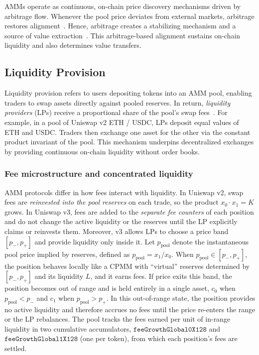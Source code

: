 \documentclass[10pt,conference,compsocconf]{IEEEtran}
\begin{document}
AMMs operate as continuous, on-chain price discovery mechanisms driven by arbitrage flow. Whenever the pool price deviates from external markets, arbitrage restores alignment~\cite{angeris2020improved}.
Hence, arbitrage creates a stabilizing mechanism and a source of value extraction~\cite{pusceddu2024lean}.
This arbitrage-based alignment sustains on-chain liquidity and also determines value transfers.

\subsection{Liquidity Provision}
\label{sec:liquidity-provision}

Liquidity provision refers to users depositing tokens into an AMM pool, enabling traders to swap assets directly against pooled reserves. In return, \textit{liquidity providers} (LPs) receive a proportional share of the pool’s swap fees~\cite{gogol2024sok, chiu2023fragility, saengchote2023decentralized}.
For example, in a pool of Uniswap v2 ETH / USDC, LPs deposit equal values of ETH and USDC. Traders then exchange one asset for the other via the constant product invariant of the pool. This mechanism underpins decentralized exchanges by providing continuous on-chain liquidity without order books.

\subsubsection{Fee microstructure and concentrated liquidity}
AMM protocols differ in how fees interact with liquidity.
In Uniswap v2, swap fees are \emph{reinvested into the pool reserves} on each trade, so the product $x_0 \cdot x_1{=}K$ grows.
In Uniswap v3, fees are added to the \emph{separate fee counters} of each position and do not change the active liquidity or the reserves until the LP explicitly claims or reinvests them.
Moreover, v3 allows LPs to choose a price band $[p_{-},p_{+}]$ and provide liquidity only inside it.
Let $p_{\text{pool}}$ denote the instantaneous pool price implied by reserves, defined as
$p_{\text{pool}} = x_1/x_0$.
When $p_{\text{pool}}\in[p_{-},p_{+}]$, the position behaves locally like a CPMM with ``virtual'' reserves determined by $[p_{-},p_{+}]$ and its liquidity $L$, and it earns fees.
If price exits this band, the position becomes out of range and is held entirely in a single asset, $c_0$ when $p_{\text{pool}}<p_{-}$ and $c_1$ when $p_{\text{pool}}>p_{+}$.
In this out-of-range state, the position provides no active liquidity and therefore accrues no fees until the price re-enters the range or the LP rebalances.
The pool tracks the fees earned per unit of in-range liquidity in two cumulative accumulators, $\texttt{feeGrowthGlobal0X128}$ and $\texttt{feeGrowthGlobal1X128}$ (one per token), from which each position's fees are settled.
\end{document}
